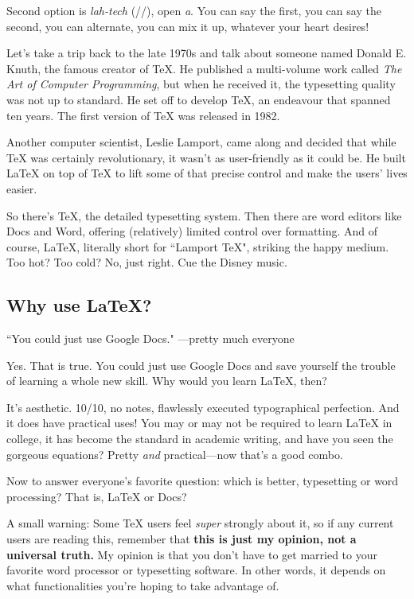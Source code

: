 \documentclass[letterpaper, 12pt]{article}
\begin{document}
Second option is \textit{lah-tech} (//), open \emph{a}. You can say the first, you can say the second, you can alternate, you can mix it up, whatever your heart desires!

Let's take a trip back to the late 1970s and talk about someone named Donald E. Knuth, the famous creator of \TeX{}. He published a multi-volume work called \textit{The Art of Computer Programming}, but when he received it, the typesetting quality was not up to standard. He set off to develop \TeX{}, an endeavour that spanned ten years. The first version of \TeX{} was released in 1982.

Another computer scientist, Leslie Lamport, came along and decided that while \TeX{} was certainly revolutionary, it wasn't as user-friendly as it could be. He built \LaTeX{} on top of \TeX{} to lift some of that precise control and make the users' lives easier.

So there's \TeX, the detailed typesetting system. Then there are word editors like Docs and Word, offering (relatively) limited control over formatting. And of course, \LaTeX, literally short for ``Lamport \TeX", striking the happy medium. Too hot? Too cold? No, just right. Cue the Disney music.

\subsection{Why use \LaTeX?}
``You could just use Google Docs." ---pretty much everyone

Yes. That is true. You could just use Google Docs and save yourself the trouble of learning a whole new skill. Why would you learn \LaTeX{}, then?

It's aesthetic. 10/10, no notes, flawlessly executed typographical perfection. And it does have practical uses! You may or may not be required to learn \LaTeX{} in college, it has become the standard in academic writing, and have you seen the gorgeous equations? Pretty \textit{and} practical---now that's a good combo.

Now to answer everyone's favorite question: which is better, typesetting or word processing? That is, \LaTeX{} or Docs?

A small warning: Some \TeX{} users feel \textit{super} strongly about it, so if any current users are reading this, remember that \textbf{this is just my opinion, not a universal truth.} My opinion is that you don't have to get married to your favorite word processor or typesetting software. In other words, it depends on what functionalities you're hoping to take advantage of.
\end{document}

